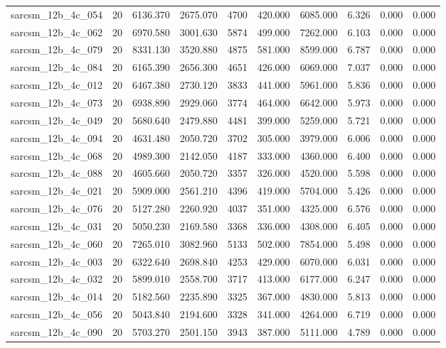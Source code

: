 \begin{tabular}{lrrrrrrrrr}
sarcsm\_12b\_4c\_054 & 20 & 6136.370 & 2675.070 & 4700 & 420.000 & 6085.000 & 6.326 & 0.000 & 0.000 \\
sarcsm\_12b\_4c\_062 & 20 & 6970.580 & 3001.630 & 5874 & 499.000 & 7262.000 & 6.103 & 0.000 & 0.000 \\
sarcsm\_12b\_4c\_079 & 20 & 8331.130 & 3520.880 & 4875 & 581.000 & 8599.000 & 6.787 & 0.000 & 0.000 \\
sarcsm\_12b\_4c\_084 & 20 & 6165.390 & 2656.300 & 4651 & 426.000 & 6069.000 & 7.037 & 0.000 & 0.000 \\
sarcsm\_12b\_4c\_012 & 20 & 6467.380 & 2730.120 & 3833 & 441.000 & 5961.000 & 5.836 & 0.000 & 0.000 \\
sarcsm\_12b\_4c\_073 & 20 & 6938.890 & 2929.060 & 3774 & 464.000 & 6642.000 & 5.973 & 0.000 & 0.000 \\
sarcsm\_12b\_4c\_049 & 20 & 5680.640 & 2479.880 & 4481 & 399.000 & 5259.000 & 5.721 & 0.000 & 0.000 \\
sarcsm\_12b\_4c\_094 & 20 & 4631.480 & 2050.720 & 3702 & 305.000 & 3979.000 & 6.006 & 0.000 & 0.000 \\
sarcsm\_12b\_4c\_068 & 20 & 4989.300 & 2142.050 & 4187 & 333.000 & 4360.000 & 6.400 & 0.000 & 0.000 \\
sarcsm\_12b\_4c\_088 & 20 & 4605.660 & 2050.720 & 3357 & 326.000 & 4520.000 & 5.598 & 0.000 & 0.000 \\
sarcsm\_12b\_4c\_021 & 20 & 5909.000 & 2561.210 & 4396 & 419.000 & 5704.000 & 5.426 & 0.000 & 0.000 \\
sarcsm\_12b\_4c\_076 & 20 & 5127.280 & 2260.920 & 4037 & 351.000 & 4325.000 & 6.576 & 0.000 & 0.000 \\
sarcsm\_12b\_4c\_031 & 20 & 5050.230 & 2169.580 & 3368 & 336.000 & 4308.000 & 6.405 & 0.000 & 0.000 \\
sarcsm\_12b\_4c\_060 & 20 & 7265.010 & 3082.960 & 5133 & 502.000 & 7854.000 & 5.498 & 0.000 & 0.000 \\
sarcsm\_12b\_4c\_003 & 20 & 6322.640 & 2698.840 & 4253 & 429.000 & 6070.000 & 6.031 & 0.000 & 0.000 \\
sarcsm\_12b\_4c\_032 & 20 & 5899.010 & 2558.700 & 3717 & 413.000 & 6177.000 & 6.247 & 0.000 & 0.000 \\
sarcsm\_12b\_4c\_014 & 20 & 5182.560 & 2235.890 & 3325 & 367.000 & 4830.000 & 5.813 & 0.000 & 0.000 \\
sarcsm\_12b\_4c\_056 & 20 & 5043.840 & 2194.600 & 3328 & 341.000 & 4264.000 & 6.719 & 0.000 & 0.000 \\
sarcsm\_12b\_4c\_090 & 20 & 5703.270 & 2501.150 & 3943 & 387.000 & 5111.000 & 4.789 & 0.000 & 0.000 \\

\end{tabular}
